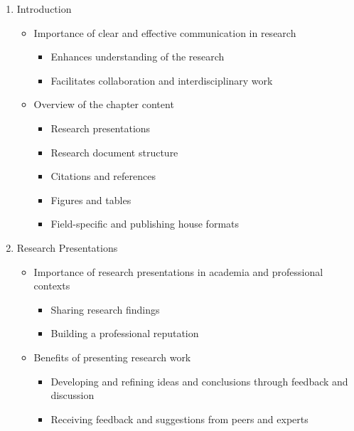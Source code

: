 \documentclass[
  letterpaper,
]{latex/krantz}
\providecommand{\tightlist}{%
  \setlength{\itemsep}{0pt}\setlength{\parskip}{0pt}}\usepackage{longtable,booktabs,array}
\begin{document}
\begin{enumerate}
\def\labelenumi{\arabic{enumi}.}
\tightlist
\item
  Introduction

  \begin{itemize}
  \tightlist
  \item
    Importance of clear and effective communication in research

    \begin{itemize}
    \tightlist
    \item
      Enhances understanding of the research
    \item
      Facilitates collaboration and interdisciplinary work
    \end{itemize}
  \item
    Overview of the chapter content

    \begin{itemize}
    \tightlist
    \item
      Research presentations
    \item
      Research document structure
    \item
      Citations and references
    \item
      Figures and tables
    \item
      Field-specific and publishing house formats
    \end{itemize}
  \end{itemize}
\item
  Research Presentations

  \begin{itemize}
  \tightlist
  \item
    Importance of research presentations in academia and professional
    contexts

    \begin{itemize}
    \tightlist
    \item
      Sharing research findings
    \item
      Building a professional reputation
    \end{itemize}
  \item
    Benefits of presenting research work

    \begin{itemize}
    \tightlist
    \item
      Developing and refining ideas and conclusions through feedback and
      discussion
    \item
      Receiving feedback and suggestions from peers and experts


\end{itemize}
\end{itemize}
\end{enumerate}
\end{document}
